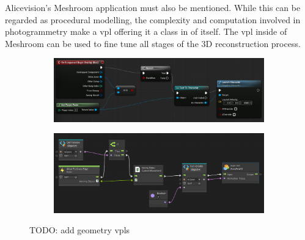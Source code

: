 Alicevision's Meshroom application must also be mentioned.
While this can be regarded as procedural modelling, the complexity and computation involved in photogrammetry make a vpl offering it a class in of itself. 
The vpl inside of Meshroom can be used to fine tune all stages of the 3D reconstruction process.

\begin{figure}
  \centering
  \begin{subfigure}[b]{0.45\linewidth}
    \graphicspath{{../../assets/images/background/geo-vpl/}}
    \centering
    \includegraphics[width=\linewidth]{unreal-blueprints.jpg}
    \caption{}\label{fig:geo-vpl:1}
  \end{subfigure}%
  \qquad %
  \begin{subfigure}[b]{0.45\linewidth}
    \graphicspath{{../../assets/images/background/geo-vpl/}}
    \centering
    \includegraphics[width=\linewidth]{unity-bolt-2.png}
    \caption{}\label{fig:geo-vpl:2}
  \end{subfigure}%
  \caption[Geometry VPLs]{TODO: add geometry vpls}
  \label{fig:geo-vpl}
  \end{figure}

